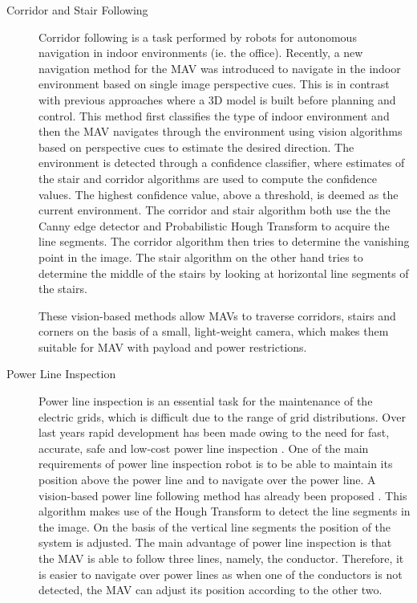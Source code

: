\documentclass[a4paper]{article}
\begin{document}
\begin{description}
\item[Corridor and Stair Following] Corridor following is a task performed by robots for autonomous navigation in indoor environments (ie. the office). Recently, a new navigation method for the MAV \cite{Bills2011} was introduced to navigate in the indoor environment based on single image perspective cues. This is in contrast with previous approaches where a 3D model is built before planning and control. This method first classifies the type of indoor environment and then the MAV navigates through the environment using vision algorithms based on perspective cues to estimate the desired direction. The environment is detected through a confidence classifier, where estimates of the stair and corridor algorithms are used to compute the confidence values. The highest confidence value, above a threshold, is deemed as the current environment. The corridor and stair algorithm both use the the Canny edge detector and Probabilistic Hough Transform to acquire the line segments. The corridor algorithm then tries to determine the vanishing point in the image. The stair algorithm on the other hand tries to determine the middle of the stairs by looking at horizontal line segments of the stairs.

These vision-based methods allow MAVs to traverse corridors, stairs and corners on the basis of a small, light-weight camera, which makes them suitable for MAV with payload and power restrictions.

\item[Power Line Inspection] Power line inspection is an essential task for the maintenance of the electric grids, which is difficult due to the range of grid distributions. Over last years rapid development has been made owing to the need for fast, accurate, safe and low-cost power line inspection \cite{Katrasnik2010}. One of the main requirements of power line inspection robot is to be able to maintain its position above the power line and to navigate over the power line. A vision-based power line following method has already been proposed \cite{Golightly2005}. This algorithm makes use of the Hough Transform to detect the line segments in the image. On the basis of the vertical line segments the position of the system is adjusted. The main advantage of power line inspection is that the MAV is able to follow three lines, namely, the conductor. Therefore, it is easier to navigate over power lines as when one of the conductors is not detected, the MAV can adjust its position according to the other two.


\end{description}
\end{document}

